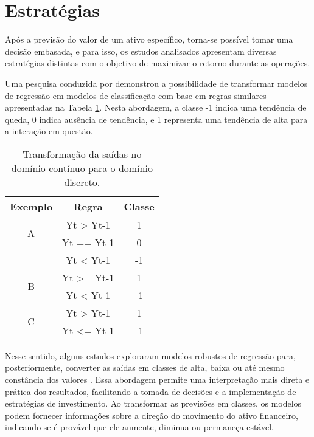 \section{Estratégias}
\label{subsec:estrategias}

Após a previsão do valor de um ativo específico, torna-se possível tomar uma decisão embasada, e para isso, os estudos analisados apresentam diversas estratégias distintas com o objetivo de maximizar o retorno durante as operações. 

Uma pesquisa conduzida por  demonstrou a possibilidade de transformar modelos de regressão em modelos de classificação com base em regras similares apresentadas na Tabela \ref{tab:RegraTransf}. Nesta abordagem, a classe -1 indica uma tendência de queda, 0 indica ausência de tendência, e 1 representa uma tendência de alta para a interação em questão. 

\begin{table}[h]
\begin{center}
\begin{tabular}{ccc}
\hline
Exemplo            & Regra                   & Classe \\ \hline
\multirow{2}{*}{A} & Yt > Yt-1    & 1      \\
             & Yt == Yt-1              & 0      \\
             & Yt < Yt-1       & -1     \\ \hline
\multirow{2}{*}{B} & Yt >= Yt-1 & 1      \\
             & Yt < Yt-1       & -1     \\ \hline
\multirow{2}{*}{C} & Yt > Yt-1    & 1      \\
             & Yt <= Yt-1    & -1     \\ \hline
\end{tabular}
\end{center}
\caption{Transformação da saídas no domínio contínuo para o domínio discreto.}
\label{tab:RegraTransf}
\end{table}

Nesse sentido, alguns estudos exploraram modelos robustos de regressão para, posteriormente, converter as saídas em classes de alta, baixa ou até mesmo constância dos valores \cite{ampomah2020evaluation, jiang2020improved, Xiaoci_Predicting}. Essa abordagem permite uma interpretação mais direta e prática dos resultados, facilitando a tomada de decisões e a implementação de estratégias de investimento. Ao transformar as previsões em classes, os modelos podem fornecer informações sobre a direção do movimento do ativo financeiro, indicando se é provável que ele aumente, diminua ou permaneça estável. 

